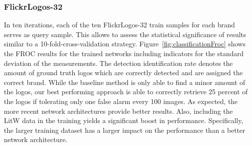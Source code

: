 \documentclass[a4paper,twoside]{article}
\begin{document}
\subsubsection*{FlickrLogos-32}
\vspace*{-2.5mm}
In ten iterations, each of the ten FlickrLogos-32 train samples for each brand serves as query sample. This allows to assess the statistical significance of results similar to a 10-fold-cross-validation strategy. Figure~\ref{fig:classificationFroc} shows the FROC results for the trained networks including indicators for the standard deviation of the measurements. The detection identification rate denotes the amount of ground truth logos which are correctly detected and are assigned the correct brand.
While the baseline method is only able to find a minor amount of the logos, our best performing approach is able to correctly retrieve 25 percent of the logos if tolerating only one false alarm every 100 images.
As expected, the more recent network architectures provide better results. Also, including the \ac{LitW} data in the training yields a significant boost in performance. Specifically, the larger training dataset has a larger impact on the performance than a better network architecture. 
\end{document}
